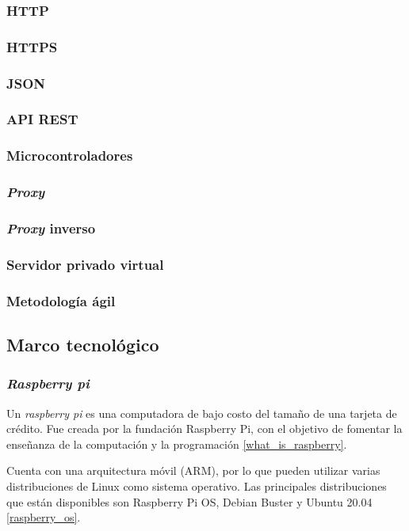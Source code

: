 \subsubsection{HTTP}
\subsubsection{HTTPS}
\subsubsection{JSON}
\subsubsection{API REST}
\subsubsection{Microcontroladores}
\subsubsection{\textit{Proxy}}
\subsubsection{\textit{Proxy} inverso}
\subsubsection{Servidor privado virtual}


\subsubsection{Metodología ágil} %

\subsection{Marco tecnológico}

\subsubsection{\textit{Raspberry pi}}
Un \textit{raspberry pi} es una computadora de bajo costo del tamaño de una tarjeta de crédito. Fue creada por la fundación Raspberry Pi, con el objetivo de fomentar la enseñanza de la computación y la programación \ref{what_is_raspberry}.

Cuenta con una arquitectura móvil (ARM), por lo que pueden utilizar varias distribuciones de Linux como sistema operativo. Las principales distribuciones que están disponibles son Raspberry Pi OS, Debian Buster y Ubuntu 20.04 \ref{raspberry_os}.

